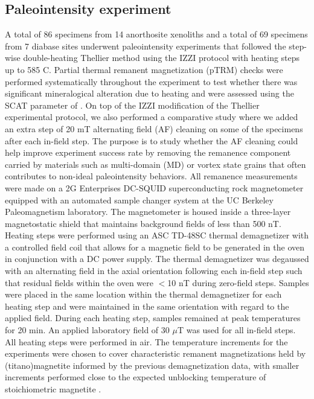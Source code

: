 \documentclass[draft]{agujournal2019}
\begin{document}
\subsection*{Paleointensity experiment}
A total of 86 specimens from 14 anorthosite xenoliths and a total of 69 specimens from 7 diabase sites underwent paleointensity experiments that followed the step-wise double-heating Thellier method \cite{Thellier1959a} using the IZZI protocol \cite{Tauxe2004a} with heating steps up to 585 \textdegree C. Partial thermal remanent magnetization (pTRM) checks were performed systematically throughout the experiment to test whether there was significant mineralogical alteration due to heating and were assessed using the SCAT parameter of . On top of the IZZI modification of the Thellier experimental protocol, we also performed a comparative study where we added an extra step of 20 mT alternating field (AF) cleaning on some of the specimens after each in-field step. The purpose is to study whether the AF cleaning could help improve experiment success rate by removing the remanence component carried by materials such as multi-domain (MD) or vortex state grains that often contributes to non-ideal paleointensity behaviors. All remanence measurements were made on a 2G Enterprises DC-SQUID superconducting rock magnetometer equipped with an automated sample changer system at the UC Berkeley Paleomagnetism laboratory. The magnetometer is housed inside a three-layer magnetostatic shield that maintains background fields of less than 500 nT. Heating steps were performed using an ASC TD-48SC thermal demagnetizer with a controlled field coil that allows for a magnetic field to be generated in the oven in conjunction with a DC power supply. The thermal demagnetizer was degaussed with an alternating field in the axial orientation following each in-field step such that residual fields within the oven were $<$10 nT during zero-field steps. Samples were placed in the same location within the thermal demagnetizer for each heating step and were maintained in the same orientation with regard to the applied field. During each heating step, samples remained at peak temperatures for 20 min. An applied laboratory field of 30 $\mu$T was used for all in-field steps. All heating steps were performed in air. The temperature increments for the experiments were chosen to cover characteristic remanent magnetizations held by (titano)magnetite informed by the previous demagnetization data, with smaller increments performed close to the expected unblocking temperature of stoichiometric magnetite \cite{Zhang2021b}. 
\end{document}
